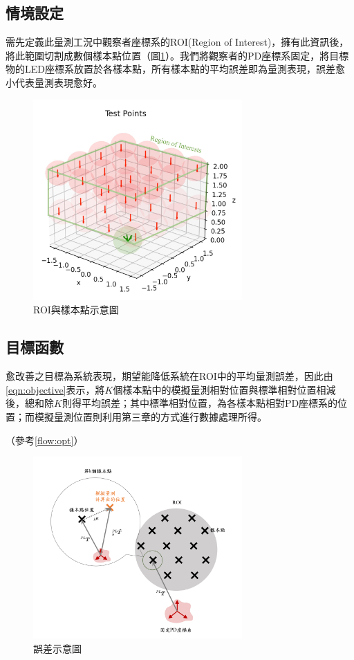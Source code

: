 \clearpage

\subsection{情境設定}

需先定義此量測工況中觀察者座標系的ROI(Region of Interest)，擁有此資訊後，將此範圍切割成數個樣本點位置（圖\ref{pic:testpoint}）。我們將觀察者的PD座標系固定，將目標物的LED座標系放置於各樣本點，所有樣本點的平均誤差即為量測表現，誤差愈小代表量測表現愈好。

\begin{figure}[ht]
    \centering
    \includegraphics[width=8cm]{ch3pic/testpoint.jpg}
    \caption{ROI與樣本點示意圖}
    \label{pic:testpoint}
\end{figure}

\clearpage

\subsection{目標函數}

愈改善之目標為系統表現，期望能降低系統在ROI中的平均量測誤差，因此由\ref{eqn:objective}表示，將$K$個樣本點中的模擬量測相對位置與標準相對位置相減後，總和除$K$則得平均誤差；其中標準相對位置，為各樣本點相對PD座標系的位置；而模擬量測位置則利用第三章的方式進行數據處理所得。


（參考\ref{flow:opt}）

\begin{figure}[ht]
    \centering
    \includegraphics[width=8cm]{ch4pic/error.png}
    \caption{誤差示意圖}
    \label{pic:error}
\end{figure}


